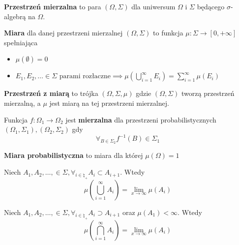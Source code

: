 \begin{definition}
	\textbf{Przestrzeń mierzalna} to para \((\Omega, \Sigma)\) dla uniwersum \(\Omega\) i \(\Sigma\) będącego \(\sigma\)-algebrą na \(\Omega\).
\end{definition}

\begin{definition}
	\textbf{Miara} dla danej przestrzeni mierzalnej \((\Omega, \Sigma)\) to funkcja \(\mu: \Sigma \to [0, +\infty]\) spełniająca
	\begin{itemize}
		\item \(\mu(\emptyset) = 0\)
		\item \(E_1, E_2, \dots \in \Sigma \text{ parami rozłaczne} \implies \mu(\bigcup_{i=1}^\infty E_i) = \sum_{i=1}^{\infty} \mu(E_i)\)
	\end{itemize}
\end{definition}

\begin{definition}
	\textbf{Przestrzeń z miarą} to trójka \((\Omega, \Sigma, \mu)\) gdzie \((\Omega, \Sigma)\) tworzą przestrzeń mierzalną, a \(\mu\) jest miarą na tej przestrzeni mierzalnej.
\end{definition}

\begin{definition}
	Funkcja \(f: \Omega_1 \to \Omega_2\) jest \textbf{mierzalna} dla przestrzeni probabilistycznych \((\Omega_1, \Sigma_1), (\Omega_2, \Sigma_2)\) gdy
	\[
		\forall_{B \in \Sigma_2} f^{-1}(B) \in \Sigma_1
	\]
\end{definition}

\begin{definition}
	\textbf{Miara probabilistyczna} to miara dla której \(\mu(\Omega) = 1\)
\end{definition}

\begin{lemma}
	Niech \(A_1, A_2, \dots, \in \Sigma, \forall_{i \in \natural_+} A_i \subset A_{i+1}\). Wtedy
	\[
		\mu(\bigcup_{i=1}^\infty A_i) = \lim_{x \to \infty} \mu(A_i)
	\]
\end{lemma}

\begin{lemma}
	Niech \(A_1, A_2, \dots, \in \Sigma, \forall_{i \in \natural_+} A_i \supset A_{i+1}\) oraz \(\mu(A_1) < \infty\). Wtedy
	\[
		\mu(\bigcap_{i=1}^\infty A_i) = \lim_{x \to \infty} \mu(A_i)
	\]
\end{lemma}

